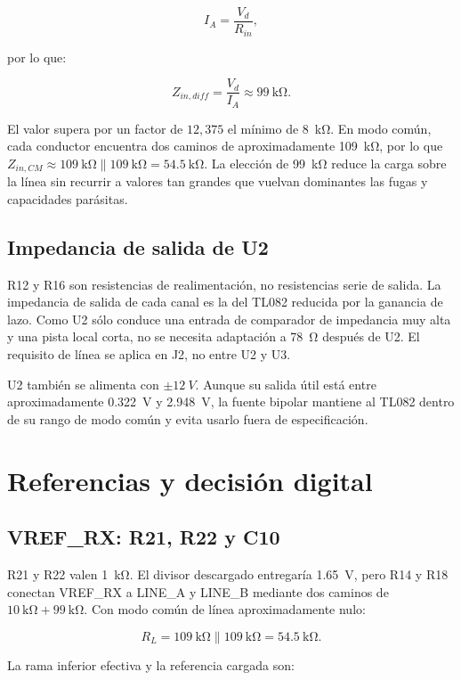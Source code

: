 \documentclass[11pt,a4paper]{article}
\begin{document}
\[
 I_A=\frac{V_d}{R_{in}},
\]

por lo que:

\[
 Z_{in,diff}=\frac{V_d}{I_A}\approx\SI{99}{\kilo\ohm}.
\]

El valor supera por un factor de $12{,}375$ el mínimo de
\SI{8}{\kilo\ohm}. En modo común, cada conductor encuentra dos caminos de
aproximadamente \SI{109}{\kilo\ohm}, por lo que
$Z_{in,CM}\approx\SI{109}{\kilo\ohm}\parallel\SI{109}{\kilo\ohm}
=\SI{54.5}{\kilo\ohm}$.
La elección de \SI{99}{\kilo\ohm} reduce la carga sobre la línea sin recurrir
a valores tan grandes que vuelvan dominantes las fugas y capacidades parásitas.

\subsection{Impedancia de salida de U2}

R12 y R16 son resistencias de realimentación, no resistencias serie de salida.
La impedancia de salida de cada canal es la del TL082 reducida por la ganancia
de lazo. Como U2 sólo conduce una entrada de comparador de impedancia muy alta y
una pista local corta, no se necesita adaptación a \SI{78}{\ohm} después de U2.
El requisito de línea se aplica en J2, no entre U2 y U3.

U2 también se alimenta con $\pm\SI{12}{V}$. Aunque su salida útil está entre
aproximadamente \SI{0.322}{V} y \SI{2.948}{V}, la fuente bipolar mantiene al
TL082 dentro de su rango de modo común y evita usarlo fuera de especificación.

\section{Referencias y decisión digital}

\subsection{VREF\_RX: R21, R22 y C10}

R21 y R22 valen \SI{1}{\kilo\ohm}. El divisor descargado entregaría
\SI{1.65}{V}, pero R14 y R18 conectan VREF\_RX a LINE\_A y LINE\_B mediante
dos caminos de $\SI{10}{\kilo\ohm}+\SI{99}{\kilo\ohm}$. Con modo común de
línea aproximadamente nulo:

\[
 R_L=\SI{109}{\kilo\ohm}\parallel\SI{109}{\kilo\ohm}
 =\SI{54.5}{\kilo\ohm}.
\]

La rama inferior efectiva y la referencia cargada son:
\end{document}
